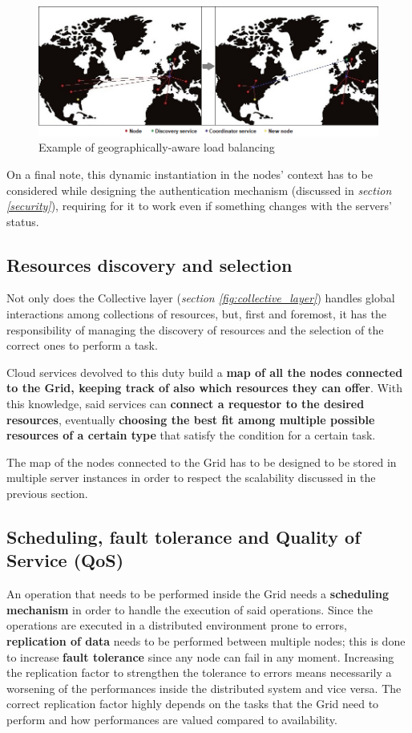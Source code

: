 \begin{figure}[!ht]
    \centering
    \includegraphics[width=\textwidth]{document/chapters/chapter_2/images/server_instantiation.png}
    \caption{Example of geographically-aware load balancing}
    \label{fig:server_instantiation}
\end{figure}

On a final note, this dynamic instantiation in the nodes' context has to be considered while designing the authentication mechanism (discussed in \textit{section \ref{security}}), requiring for it to work even if something changes with the servers' status.


\subsection{Resources discovery and selection}\label{resources_discovery_and_selection}
Not only does the Collective layer (\textit{section \ref{fig:collective_layer}}) handles global interactions among collections of resources, but, first and foremost, it has the responsibility of managing the discovery of resources and the selection of the correct ones to perform a task.

Cloud services devolved to this duty build a \textbf{map of all the nodes connected to the Grid, keeping track of also which resources they can offer}. With this knowledge, said services can \textbf{connect a requestor to the desired resources}, eventually \textbf{choosing the best fit among multiple possible resources of a certain type} that satisfy the condition for a certain task.

The map of the nodes connected to the Grid has to be designed to be stored in multiple server instances in order to respect the scalability discussed in the previous section.

\subsection{Scheduling, fault tolerance and Quality of Service (QoS)}
An operation that needs to be performed inside the Grid needs a \textbf{scheduling mechanism} in order to handle the execution of said operations. Since the operations are executed in a distributed environment prone to errors, \textbf{replication of data} needs to be performed between multiple nodes; this is done to increase \textbf{fault tolerance} since any node can fail in any moment. Increasing the replication factor to strengthen the tolerance to errors means necessarily a worsening of the performances inside the distributed system and vice versa. The correct replication factor highly depends on the tasks that the Grid need to perform and how performances are valued compared to availability.

